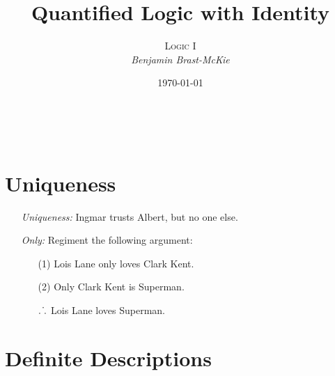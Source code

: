 \documentclass[a4paper, 11pt]{article} %
\title{\textbf{Quantified Logic with Identity}} %
\author{\textsc{Logic I}\\ \em Benjamin Brast-McKie} %
\date{\today} %
\makeatletter
\def\therefore{\ensuremath{\ldotp\dot\,\ldotp}}
\renewcommand{\maketitle}{ %
\begin{flushright} %
{\LARGE\@title} %

\vspace{10pt} %

{\@author} %
\\\@date %

\vspace{60pt} %
\end{flushright}
}
\makeatother
\begin{document}
\maketitle %

\thispagestyle{empty}





\section*{Uniqueness}

\begin{enumerate}
  \item[\it Uniqueness:] Ingmar trusts Albert, but no one else.
  \item[\it Only:] Regiment the following argument:
    \begin{itemize}
      \item[(1)] Lois Lane only loves Clark Kent.
      \item[(2)] Only Clark Kent is Superman.
      \item[$\therefore$] Lois Lane loves Superman.
    \end{itemize}
\end{enumerate}





\section*{Definite Descriptions}
\end{document}
